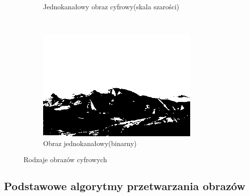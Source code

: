 \begin{figure}
\begin{subfigure}[b]{0.3\textwidth}
    \caption{Jednokanałowy obraz cyfrowy(skala szarości)}
    \label{fig:basics_image_gray}
  \end{subfigure}
  ~
  \begin{subfigure}[b]{0.3\textwidth}
    \includegraphics[width=\textwidth]{img/basics-image-binary}
    \caption{Obraz jednokanałowy(binarny)}
    \label{fig:basics_image_binary}
  \end{subfigure}
  \caption{Rodzaje obrazów cyfrowych}\label{fig:image_examples}
\end{figure}
\subsection{Podstawowe algorytmy przetwarzania obrazów}
